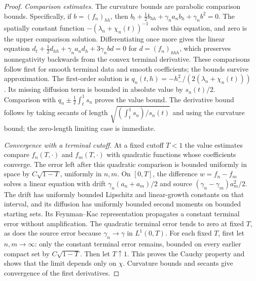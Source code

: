 \documentclass[11pt,a4paper]{article}
\numberwithin{equation}{section}
\theoremstyle{definition}
\theoremstyle{remark}
\begin{document}
\begin{proof}
\emph{Comparison estimates.}
The curvature bounds are parabolic comparison bounds.  Specifically,
if $b=(f_n)_{hh}$, then
$b_t+\tfrac12b_{hh}+\gamma_n a_n b_h+\gamma_n b^2=0$.
The spatially constant function
$-(\lambda_n+\chi_n(t))^{-1}$ solves this equation, and zero is the upper
comparison solution.  Differentiating once more gives the linear
equation
$d_t+\tfrac12d_{hh}+\gamma_n a_n d_h+3\gamma_n b d=0$ for
$d=(f_n)_{hhh}$, which preserves nonnegativity backwards from the convex
terminal derivative.  These comparisons follow first for smooth
terminal data and smooth coefficients; the bounds survive approximation.
The first-order solution is
$q_n(t,h)=-h_-^2/(2(\lambda_n+\chi_n(t)))$.
Its missing diffusion term is bounded in absolute value by $s_n(t)/2$.
Comparison with $q_n\pm\tfrac12\int_t^1s_n$ proves the value bound.
The derivative bound follows by taking secants of length
$\sqrt{(\int_t^1s_n)/s_n(t)}$ and using the curvature bound; the
zero-length limiting case is immediate.

\emph{Convergence with a terminal cutoff.}
At a
fixed cutoff $T<1$ the value estimates compare $f_n(T,\cdot)$ and
$f_m(T,\cdot)$ with quadratic functions whose coefficients converge.
The error left after this quadratic comparison is bounded uniformly
in space by $C\sqrt{1-T}$, uniformly in $n,m$.  On $[0,T]$, the difference $w=f_n-f_m$ solves a linear equation
with drift $\gamma_n(a_n+a_m)/2$ and source
$(\gamma_n-\gamma_m)a_m^2/2$.  The drift has uniformly bounded
Lipschitz and linear-growth constants on that interval, and its diffusion
has uniformly bounded second moments on bounded starting sets.  Its
Feynman--Kac representation propagates a constant terminal error without
amplification.  The quadratic terminal error tends to zero at fixed
$T$, as does the source error because $\gamma_n\to\gamma$ in $L^1(0,T)$.
For each fixed $T$, first let $n,m\to\infty$: only the constant
terminal error remains, bounded on every earlier compact set by
$C\sqrt{1-T}$. Then let $T\uparrow1$. This proves the Cauchy property
and shows that the limit depends only on $\chi$.  Curvature bounds and secants give convergence of the first
derivatives.


\end{proof}
\end{document}
